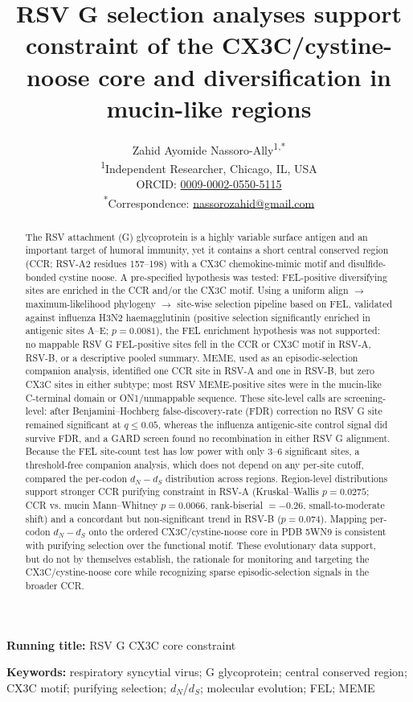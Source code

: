 \documentclass[11pt]{article}
\title{\textbf{RSV G selection analyses support constraint of the CX3C/cystine-noose core and diversification in mucin-like regions}}
\author{Zahid Ayomide Nassoro-Ally\textsuperscript{1,*}\\[0.5em]
\small \textsuperscript{1}Independent Researcher, Chicago, IL, USA\\
\small ORCID: \href{https://orcid.org/0009-0002-0550-5115}{0009-0002-0550-5115}\\
\small \textsuperscript{*}Correspondence: \href{mailto:nassorozahid@gmail.com}{nassorozahid@gmail.com}}
\date{}
\newcommand{\dndsdiff}{\ensuremath{d_N-d_S}}
\newcommand{\dn}{\ensuremath{d_N}}
\newcommand{\ds}{\ensuremath{d_S}}
\begin{document}
\maketitle

\noindent\textbf{Running title:} RSV G CX3C core constraint

\noindent\textbf{Keywords:} respiratory syncytial virus; G glycoprotein; central conserved region; CX3C motif; purifying selection; \dn/\ds; molecular evolution; FEL; MEME

\begin{abstract}
The RSV attachment (G) glycoprotein is a highly variable surface antigen and an important target of humoral immunity, yet it contains a short central conserved region (CCR; RSV-A2 residues 157--198) with a CX3C chemokine-mimic motif and disulfide-bonded cystine noose. A pre-specified hypothesis was tested: FEL-positive diversifying sites are enriched in the CCR and/or the CX3C motif. Using a uniform align $\rightarrow$ maximum-likelihood phylogeny $\rightarrow$ site-wise selection pipeline based on FEL, validated against influenza H3N2 haemagglutinin (positive selection significantly enriched in antigenic sites A--E; $p=0.0081$), the FEL enrichment hypothesis was not supported: no mappable RSV G FEL-positive sites fell in the CCR or CX3C motif in RSV-A, RSV-B, or a descriptive pooled summary. MEME, used as an episodic-selection companion analysis, identified one CCR site in RSV-A and one in RSV-B, but zero CX3C sites in either subtype; most RSV MEME-positive sites were in the mucin-like C-terminal domain or ON1/unmappable sequence. These site-level calls are screening-level: after Benjamini--Hochberg false-discovery-rate (FDR) correction no RSV G site remained significant at $q\leq0.05$, whereas the influenza antigenic-site control signal did survive FDR, and a GARD screen found no recombination in either RSV G alignment. Because the FEL site-count test has low power with only 3--6 significant sites, a threshold-free companion analysis, which does not depend on any per-site cutoff, compared the per-codon \dndsdiff{} distribution across regions. Region-level distributions support stronger CCR purifying constraint in RSV-A (Kruskal--Wallis $p=0.0275$; CCR vs. mucin Mann--Whitney $p=0.0066$, rank-biserial $=-0.26$, small-to-moderate shift) and a concordant but non-significant trend in RSV-B ($p=0.074$). Mapping per-codon \dndsdiff{} onto the ordered CX3C/cystine-noose core in PDB 5WN9 is consistent with purifying selection over the functional motif. These evolutionary data support, but do not by themselves establish, the rationale for monitoring and targeting the CX3C/cystine-noose core while recognizing sparse episodic-selection signals in the broader CCR.
\end{abstract}
\end{document}
